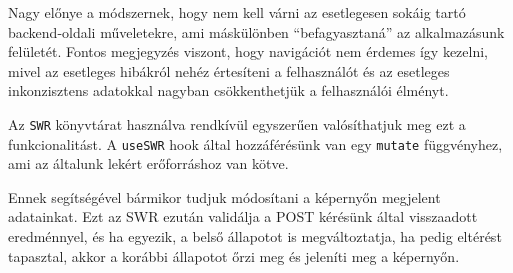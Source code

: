 Nagy előnye a módszernek, hogy nem kell várni az esetlegesen sokáig tartó backend-oldali műveletekre, ami máskülönben ``befagyasztaná'' az alkalmazásunk
felületét. Fontos megjegyzés viszont, hogy navigációt nem érdemes így kezelni, mivel az esetleges hibákról nehéz értesíteni a felhasználót
és az esetleges inkonzisztens adatokkal nagyban csökkenthetjük a felhasználói élményt.

Az \lstinline|SWR| könyvtárat használva rendkívül egyszerűen valósíthatjuk meg ezt a funkcionalitást. A \lstinline|useSWR| hook által hozzáférésünk
van egy \lstinline|mutate| függvényhez, ami az általunk lekért erőforráshoz van kötve.

Ennek segítségével bármikor tudjuk módosítani a képernyőn megjelent adatainkat.
Ezt az SWR ezután validálja a POST kérésünk által visszaadott eredménnyel, és ha egyezik,
a belső állapotot is megváltoztatja, ha pedig eltérést tapasztal, akkor a korábbi állapotot őrzi meg és jeleníti meg a képernyőn.

